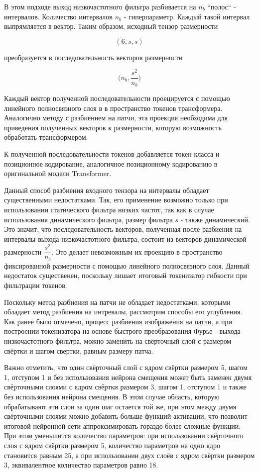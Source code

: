 В этом подходе выход низкочастотного фильтра разбивается на $n_b$ ``полос`` - интервалов. Количество интервалов $n_b$ - гиперпараметр. Каждый такой интервал выпрямляется в вектор. Таким образом, исходный тензор размерности 

$$
(6, s, s) 
$$

преобразуется в последовательность векторов размерности

$$
\Big(n_b, \dfrac{s^2}{n_b}\Big)
$$

Каждый вектор полученной последовательности проецируется с помощью линейного полносвязного слоя в в пространство токенов трансформера. Аналогично методу с разбиением на патчи, эта проекция необходима для приведения полученных векторов к размерности, которую возможность обработать трансформером.

К полученной последовательности токенов добавляется токен класса и позиционное кодирование, аналогичное позиционному кодированию в оригинальной модели Transformer. 

Данный способ разбиения входного тензора на интервалы обладает существенными недостатками. Так, его применение возможно только при использовании статического фильтра низких частот, так как в случае использования динамического фильтра, размер фильтра $s$ - также динамический. Это значит, что последовательность векторов, полученная после разбиения на интервалы выхода низкочастотного фильтра, состоит из векторов динамической размерности $\dfrac{s^2}{n_b}$. Это делает невозможным их проекцию в пространство фиксированной размерности с помощью линейного полносвязного слоя. Данный недостаток существенен, поскольку лишает итоговый токенизатор гибкости при фильтрации токенов.

Поскольку метод разбиения на патчи не обладает недостатками, которыми обладает метод разбиения на интревалы, рассмотрим способы его углубления. Как ранее было отмечено, процесс разбиения изображения на патчи, а при построении токенизатора на основе быстрого преобразования Фурье - выхода низкочастотного фильтра, можно заменить на свёрточный слой с размером свёртки и шагом свертки, равным размеру патча.

Важно отметить, что один свёрточный слой с ядром свёртки размером 5, шагом 1, отступом 1 и без использования нейрона смещения может быть заменен \cite{conv_replace} двумя свёрточными слоями с ядром свёртки размером 3, шагом 1, отступом 1 и также без использования нейрона смещения. В этом случае область, которую обрабатывают эти слои за один шаг остается той же, при этом между двумя свёрточными слоями можно добавить больше функций активации, что позволит итоговой нейронной сети аппроксимировать гораздо более сложные функции. При этом уменьшится количество параметров: при использовании свёрточного слоя с ядром свёртки размером 5, количество параметров на одно ядро становится равным 25, а при использовании двух слоёв с ядром свёртки размером 3, эквивалентное количество параметров равно 18. 


